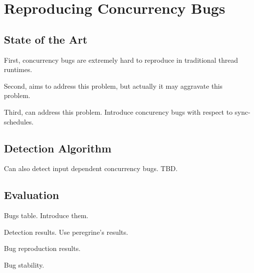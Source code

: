 \chapter{Reproducing Concurrency Bugs} \label{sec:bugs}

\section{State of the Art} \label{sec:bugs-intro}
First, concurrency bugs are extremely hard to reproduce in traditional thread runtimes.

Second, \dmt aims to address this problem, but actually it may aggravate this problem.

Third, \smt can address this problem. Introduce concurency bugs with respect to sync-schedules.

\section{Detection Algorithm} \label{sec:bugs-detection}

Can also detect input dependent concurrency bugs.
TBD.

\section{Evaluation} \label{sec:bugs-evaluation}

Bugs table. Introduce them.

Detection results. Use peregrine's results.

Bug reproduction results.

Bug stability.